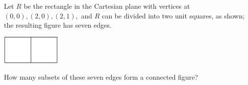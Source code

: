 Let $R$ be the rectangle in the Cartesian plane with vertices at $(0,0), (2,0), (2,1),$ and  $R$ can be divided into two unit squares, as shown; the resulting figure has seven edges.

\begin{center}
\includegraphics[width = 29.0mm]{img/fig0.png}
\end{center}
How many subsets of these seven edges form a connected figure?